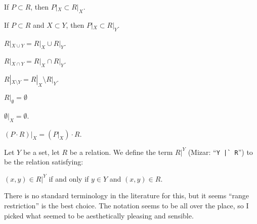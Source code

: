 \documentclass{article}
\begin{document}
\begin{thm}
\item\label{relat1:76} If $P\subset R$, then $P|_{X}\subset R|_{X}$.
\item\label{relat1:77} If $P\subset R$ and $X\subset Y$,
  then $P|_{X}\subset R|_{Y}$.
\item\label{relat1:78} $R|_{X\cup Y}=R|_{X}\cup R|_{Y}$.
\item\label{relat1:79} $R|_{X\cap Y}=R|_{X}\cap R|_{Y}$.
\item\label{relat1:80} $R|_{X\setminus Y}=R|_{X}\setminus R|_{Y}$.
\item\label{relat1:81} $R|_{\emptyset}=\emptyset$
\item\label{relat1:82} $\emptyset|_{X}=\emptyset$.
\item\label{relat1:83} $(P\cdot R)|_{X}=(P|_{X})\cdot R$.
\end{thm}

\begin{definition}
Let $Y$ be a set, let $R$ be a relation.
We define the term $R|^{Y}$ (Mizar: ``\verb#Y |` R#'') to be the
relation satisfying:
\begin{defn}
\item $(x,y)\in R|^{Y}$ if and only if $y\in Y$ and $(x,y)\in R$.
\end{defn}
\end{definition}

\begin{remark}
There is no standard terminology in the literature for this, but it
seems ``range restriction'' is the best choice. The notation seems to be
all over the place, so I picked what seemed to be aesthetically pleasing
and sensible.
\end{remark}
\end{document}
